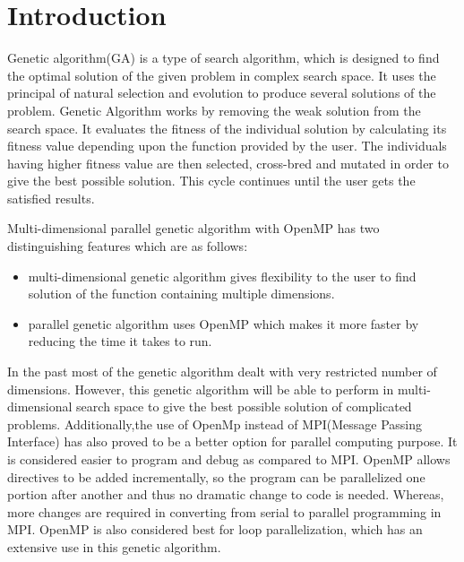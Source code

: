 \documentclass[aps,prl,preprint,groupedaddress,showkeys, nobibnotes]{revtex4-1}
\begin{document}
\maketitle

\section{\label{Intro}Introduction}
Genetic algorithm(GA) is a type of search algorithm, which is designed to find the optimal solution of the given problem in complex search space.  It uses the principal of natural selection and evolution to produce several solutions of the problem.  Genetic Algorithm works by removing the weak solution from the search space.  It evaluates the fitness of the individual solution by calculating its fitness value depending upon the function provided by the user.  The individuals having higher fitness value are then selected, cross-bred and  mutated in order to give the best possible solution.  This cycle continues until the user gets the satisfied results.

Multi-dimensional parallel genetic algorithm with OpenMP has two distinguishing features which are as follows:
\begin{itemize}
  \item multi-dimensional genetic algorithm gives flexibility to the user to find solution of the function containing multiple dimensions.
  \item parallel genetic algorithm uses OpenMP which makes it more faster by reducing the time it takes to run.
\end{itemize}

In the past most of the genetic algorithm dealt with very restricted number of dimensions.  However, this genetic algorithm will be able to perform in multi-dimensional search space to give the best possible solution of complicated problems.  Additionally,the use of OpenMp instead of MPI(Message Passing Interface) has also proved to be a better option for parallel computing purpose.  It is considered easier to program and debug as compared to MPI.  OpenMP allows directives to be added incrementally, so the program can be parallelized one portion after another and thus no dramatic change to code is needed.  Whereas, more changes are required in converting from serial to parallel programming in MPI.  OpenMP is also considered best for loop parallelization, which has an extensive use in this genetic algorithm.
\end{document}
